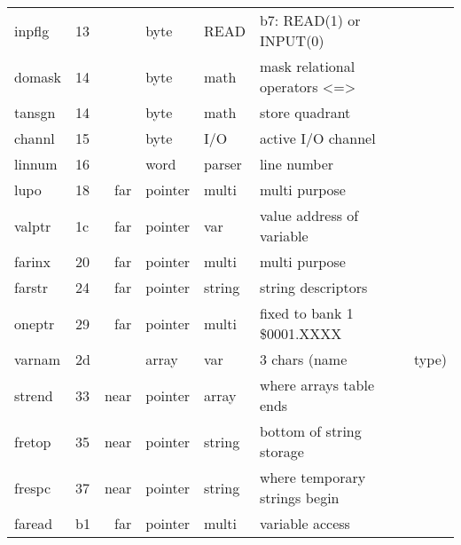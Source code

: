 \begin{tabular}{|l|l|rl|l|l|}
inpflg           &   13 &  & byte  & READ   & b7: READ(1) or INPUT(0) \\
domask           &   14 &  & byte  & math   & mask relational operators <=> \\
tansgn           &   14 &  & byte  & math   & store quadrant \\
channl           &   15 &  & byte  & I/O    & active I/O channel \\
linnum           &   16 &  & word  & parser  & line number \\
lupo             &   18 & far  & pointer  & multi  & multi purpose \\
valptr           &   1c & far  & pointer  & var    & value address of variable \\
farinx           &   20 & far  & pointer  & multi  & multi purpose \\
farstr           &   24 & far  & pointer  & string  & string descriptors \\
oneptr           &   29 & far  & pointer  & multi  & fixed to bank 1 \$0001.XXXX \\
varnam           &   2d &  & array  & var    & 3 chars (name & type) \\
strend           &   33 & near & pointer  & array  & where arrays table ends \\
fretop           &   35 & near & pointer  & string  & bottom of string storage \\
frespc           &   37 & near & pointer  & string  & where temporary strings begin \\
faread           &   b1 & far  & pointer  & multi  & variable access \\
\hline
\end{tabular}
